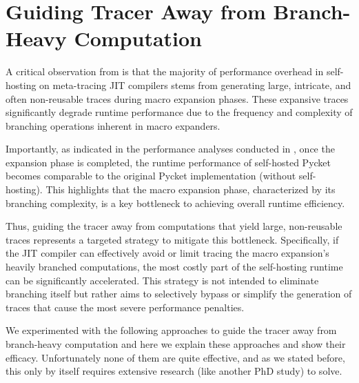	\section[\texorpdfstring{Guiding Tracer Away from Branch-Heavy Computation}{Hot Branches}]{Guiding Tracer Away from Branch-Heavy Computation}
    \label{section:hot-branches}

    \begin{paragraph-here}%
      A critical observation from  is that the majority of performance overhead in self-hosting on meta-tracing JIT compilers stems from generating large, intricate, and often non-reusable traces during macro expansion phases. These expansive traces significantly degrade runtime performance due to the frequency and complexity of branching operations inherent in macro expanders.
    \end{paragraph-here}


    \begin{paragraph-here}%
      Importantly, as indicated in the performance analyses conducted in , once the expansion phase is completed, the runtime performance of self-hosted Pycket becomes comparable to the original Pycket implementation (without self-hosting). This highlights that the macro expansion phase, characterized by its branching complexity, is a key bottleneck to achieving overall runtime efficiency.
    \end{paragraph-here}

    \begin{paragraph-here}%
      Thus, guiding the tracer away from computations that yield large, non-reusable traces represents a targeted strategy to mitigate this bottleneck. Specifically, if the JIT compiler can effectively avoid or limit tracing the macro expansion's heavily branched computations, the most costly part of the self-hosting runtime can be significantly accelerated. This strategy is not intended to eliminate branching itself but rather aims to selectively bypass or simplify the generation of traces that cause the most severe performance penalties.
    \end{paragraph-here}

    \begin{paragraph-here}%
      We experimented with the following approaches to guide the tracer away from branch-heavy computation and here we explain these approaches and show their efficacy. Unfortunately none of them are quite effective, and as we stated before, this only by itself requires extensive research (like another PhD study) to solve.
    \end{paragraph-here}

